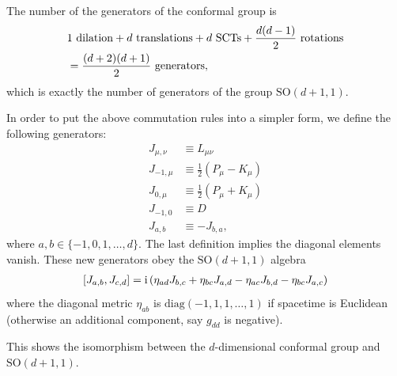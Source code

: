 \documentclass[10pt]{article}
\newcommand{\ii}{\mathrm{i}}
\begin{document}
\begin{remark}
    The number of the generators of the conformal group is
    \begin{align}
         & 1\ \mathrm{dilation}+d\ \mathrm{translations}+d\ \mathrm{SCTs}+\frac{d(d-1)}{2}\ \mathrm{rotations}\notag \\
         & =\frac{(d+2)(d+1)}{2}\ \mathrm{generators},
    \end{align}
    which is exactly the number of generators of the group $\mathrm{SO}(d+1,1)$.

    In order to put the above commutation rules into a simpler form, we define the following generators\snm:
    \begin{align}
        J_{\mu,\nu} & \equiv L_{\mu\nu}               \\
        J_{-1,\mu}  & \equiv \frac{1}{2}(P_\mu-K_\mu) \\
        J_{0,\mu}   & \equiv \frac{1}{2}(P_\mu+K_\mu) \\
        J_{-1,0}    & \equiv D                        \\
        J_{a,b}     & \equiv-J_{b,a},
    \end{align}
    where $a,b\in\{-1,0,1,\dots,d\}$.
    The last definition implies the diagonal elements vanish.
    These new generators obey the $\mathrm{SO}(d+1,1)$ algebra
    \begin{align}
        \comm{J_{a,b}}{J_{c,d}}=\ii\left(\eta_{ad}J_{b,c}+\eta_{bc}J_{a,d}-\eta_{ac}J_{b,d}-\eta_{bc}J_{a,c}\right)
    \end{align}
    where the diagonal metric $\eta_{ab}$ is $\mathrm{diag}(-1,1,1,\dots,1)$ if spacetime is Euclidean (otherwise an additional component, say $g_{dd}$ is negative).

    This shows the isomorphism between the $d$-dimensional conformal group and $\mathrm{SO}(d+1,1)$.
\end{remark}
\end{document}

